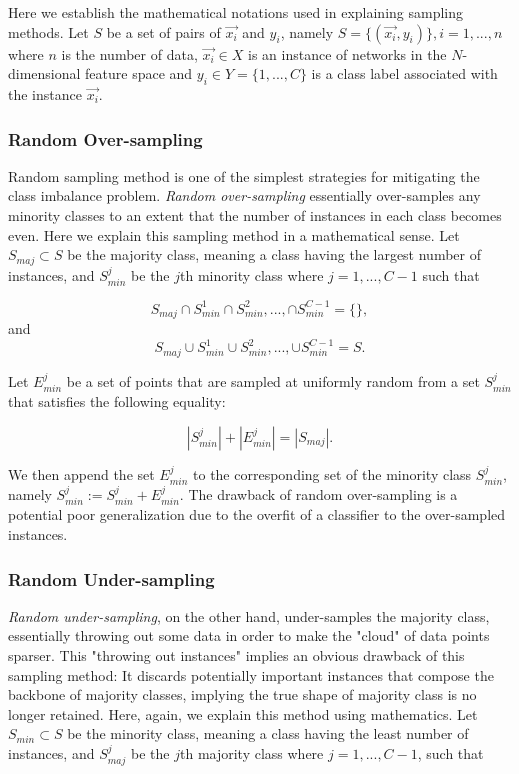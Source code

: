 \documentclass{article}
\begin{document}
 Here we establish the mathematical notations used in explaining sampling methods. Let $S$ be a set of pairs of $\vec{x_i}$ and $y_i$, namely $S =\{(\vec{x_i},y_i)\}, i = 1,...,n$ where $n$ is the number of data, $\vec{x_i} \in X$ is an instance of networks in the $N$-dimensional feature space and $y_i \in Y = \{1,...,C\}$ is a class label associated with the instance $\vec{x_i}$.   


		\subsubsection{Random Over-sampling}
		Random sampling method is one of the simplest strategies for mitigating the class imbalance problem. \textit{Random over-sampling} essentially over-samples any minority classes to an extent that the number of instances in each class becomes even. Here we explain this sampling method in a mathematical sense. Let $S_{maj} \subset S$ be the majority class, meaning a class having the largest number of instances, and $S_{min}^{j}$ be the $j$th minority class where $j = 1,...,C-1$ such that
	
	
	\begin{equation}
	S_{maj} \cap S_{min}^{1} \cap S_{min}^{2},..., \cap S_{min}^{C-1} = \{\},
	\end{equation}
	and
	\begin{equation}
	S_{maj} \cup S_{min}^{1} \cup S_{min}^{2},..., \cup S_{min}^{C-1} = S.
	\end{equation}
	
	
Let $E_{min}^j$ be a set of points that are sampled at uniformly random from a set $S_{min}^{j}$ that satisfies the following equality:

	\begin{equation}
	|S_{min}^{j}| + | E_{min}^j | = |S_{maj}|.
	\end{equation}
	
 We then append the set $E_{min}^j$ to the corresponding set of the minority class $S_{min}^{j}$, namely $S_{min}^{j} := S_{min}^{j} + E_{min}^j$. The drawback of random over-sampling is a potential poor generalization due to the overfit of a classifier to the over-sampled instances.
	
	\subsubsection{Random Under-sampling}
	\textit{Random under-sampling}, on the other hand, under-samples the majority class, essentially throwing out some data in order to make the "cloud" of data points sparser. This "throwing out instances" implies an obvious drawback of this sampling method: It discards potentially important instances that compose the backbone of majority classes, implying the true shape of majority class is no longer retained. Here, again, we explain this method using mathematics. Let $S_{min} \subset S$ be the minority class,
meaning a class having the least number of instances, and  $S_{maj}^{j}$ be the $j$th majority class where $j = 1,...,C-1$, such that
\end{document}
